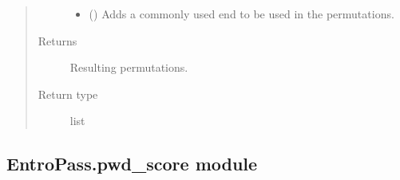 \documentclass[letterpaper,10pt,english]{sphinxmanual}
\begin{document}
\begin{fulllineitems}
\begin{fulllineitems}
\begin{quote}
\begin{description}
\begin{itemize}
\item {} 
\sphinxAtStartPar
{} (\sphinxstyleliteralemphasis{\sphinxupquote{, }}) \textendash{} Adds a commonly used end to be used in the permutations.

\end{itemize}

\item[{Returns}] \leavevmode
\sphinxAtStartPar
{} \textendash{} Resulting permutations.

\item[{Return type}] \leavevmode
\sphinxAtStartPar
list

\end{description}\end{quote}

\end{fulllineitems}


\end{fulllineitems}



\subsection{EntroPass.pwd\_score module}
\label{\detokenize{EntroPass:module-EntroPass.pwd_score}}\label{\detokenize{EntroPass:entropass-pwd-score-module}}
\end{document}
